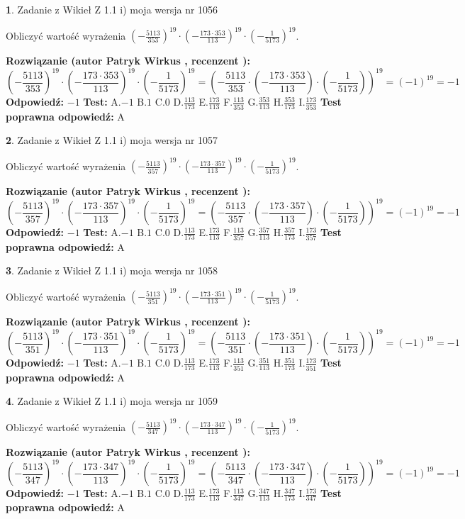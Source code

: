 \documentclass[12pt, a4paper]{article}
\theoremstyle{definition} %
\newtheorem{zad}{}
\newcommand{\zadStart}[1]{\begin{zad}#1\newline}
\newcommand{\zadStop}{\end{zad}}
\newcommand{\rozwStart}[2]{\noindent \textbf{Rozwiązanie (autor #1 , recenzent #2): }\newline}
\newcommand{\rozwStop}{\newline}
\newcommand{\odpStart}{\noindent \textbf{Odpowiedź:}\newline}
\newcommand{\odpStop}{\newline}
\newcommand{\testStart}{\noindent \textbf{Test:}\newline}
\newcommand{\testStop}{\newline}
\newcommand{\kluczStart}{\noindent \textbf{Test poprawna odpowiedź:}\newline}
\newcommand{\kluczStop}{\newline}
\begin{document}
\zadStart{Zadanie z Wikieł Z 1.1 i) moja wersja nr 1056}

Obliczyć wartość wyrażenia $(-\frac{5113}{353})^{19} \cdot (-\frac{173 \cdot 353}{113})^{19} \cdot (-\frac{1}{5173})^{19}$.
\zadStop
\rozwStart{Patryk Wirkus}{}
$$(-\frac{5113}{353})^{19} \cdot (-\frac{173 \cdot 353}{113})^{19} \cdot (-\frac{1}{5173})^{19} = (-\frac{5113}{353} \cdot (-\frac{173 \cdot 353}{113}) \cdot (-\frac{1}{5173}))^{19} = (-1)^{19} = -1$$
\rozwStop
\odpStart
$-1$
\odpStop
\testStart
A.$-1$ B.$1$ C.$0$ D.$\frac{113}{173}$ E.$\frac{173}{113}$
F.$\frac{113}{353}$ G.$\frac{353}{113}$
H.$\frac{353}{173}$
I.$\frac{173}{353}$
\testStop
\kluczStart
A
\kluczStop



\zadStart{Zadanie z Wikieł Z 1.1 i) moja wersja nr 1057}

Obliczyć wartość wyrażenia $(-\frac{5113}{357})^{19} \cdot (-\frac{173 \cdot 357}{113})^{19} \cdot (-\frac{1}{5173})^{19}$.
\zadStop
\rozwStart{Patryk Wirkus}{}
$$(-\frac{5113}{357})^{19} \cdot (-\frac{173 \cdot 357}{113})^{19} \cdot (-\frac{1}{5173})^{19} = (-\frac{5113}{357} \cdot (-\frac{173 \cdot 357}{113}) \cdot (-\frac{1}{5173}))^{19} = (-1)^{19} = -1$$
\rozwStop
\odpStart
$-1$
\odpStop
\testStart
A.$-1$ B.$1$ C.$0$ D.$\frac{113}{173}$ E.$\frac{173}{113}$
F.$\frac{113}{357}$ G.$\frac{357}{113}$
H.$\frac{357}{173}$
I.$\frac{173}{357}$
\testStop
\kluczStart
A
\kluczStop



\zadStart{Zadanie z Wikieł Z 1.1 i) moja wersja nr 1058}

Obliczyć wartość wyrażenia $(-\frac{5113}{351})^{19} \cdot (-\frac{173 \cdot 351}{113})^{19} \cdot (-\frac{1}{5173})^{19}$.
\zadStop
\rozwStart{Patryk Wirkus}{}
$$(-\frac{5113}{351})^{19} \cdot (-\frac{173 \cdot 351}{113})^{19} \cdot (-\frac{1}{5173})^{19} = (-\frac{5113}{351} \cdot (-\frac{173 \cdot 351}{113}) \cdot (-\frac{1}{5173}))^{19} = (-1)^{19} = -1$$
\rozwStop
\odpStart
$-1$
\odpStop
\testStart
A.$-1$ B.$1$ C.$0$ D.$\frac{113}{173}$ E.$\frac{173}{113}$
F.$\frac{113}{351}$ G.$\frac{351}{113}$
H.$\frac{351}{173}$
I.$\frac{173}{351}$
\testStop
\kluczStart
A
\kluczStop



\zadStart{Zadanie z Wikieł Z 1.1 i) moja wersja nr 1059}

Obliczyć wartość wyrażenia $(-\frac{5113}{347})^{19} \cdot (-\frac{173 \cdot 347}{113})^{19} \cdot (-\frac{1}{5173})^{19}$.
\zadStop
\rozwStart{Patryk Wirkus}{}
$$(-\frac{5113}{347})^{19} \cdot (-\frac{173 \cdot 347}{113})^{19} \cdot (-\frac{1}{5173})^{19} = (-\frac{5113}{347} \cdot (-\frac{173 \cdot 347}{113}) \cdot (-\frac{1}{5173}))^{19} = (-1)^{19} = -1$$
\rozwStop
\odpStart
$-1$
\odpStop
\testStart
A.$-1$ B.$1$ C.$0$ D.$\frac{113}{173}$ E.$\frac{173}{113}$
F.$\frac{113}{347}$ G.$\frac{347}{113}$
H.$\frac{347}{173}$
I.$\frac{173}{347}$
\testStop
\kluczStart
A
\kluczStop
\end{document}
